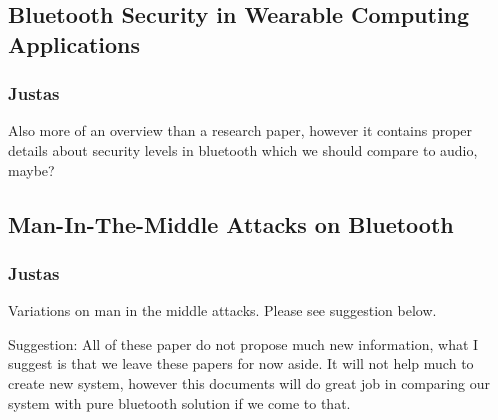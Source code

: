 \documentclass[12pt]{article}
\begin{document}
\subsection{Bluetooth Security in Wearable Computing Applications}
\label{sub:Bluetooth Security in Wearable Computing Applications}

\subsubsection{Justas}
\label{subs:Justas}

Also more of an overview than a research paper, however it contains proper details about security levels in bluetooth which we should compare to audio, maybe?

\subsection{Man-In-The-Middle Attacks on Bluetooth}
\label{sub:Man-In-The-Middle Attacks on Bluetooth}

\subsubsection{Justas}
\label{subs:Justas}

Variations on man in the middle attacks. Please see suggestion below.

Suggestion:
All of these paper do not propose much new information, what I suggest is that we leave these papers for now aside. It will not help much to create new system, however this documents will do great job in comparing our system with pure bluetooth solution if we come to that.
\end{document}

